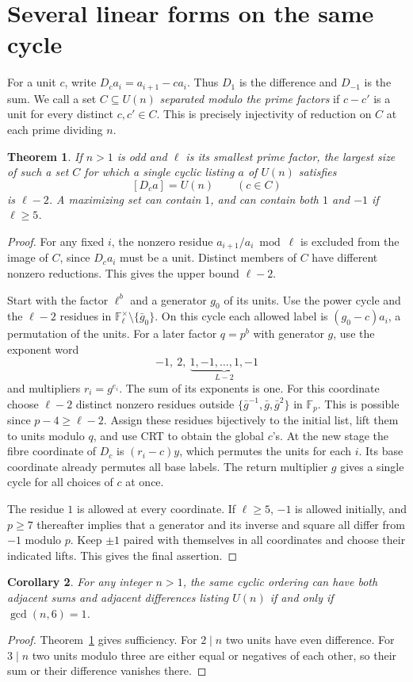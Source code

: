 \documentclass[11pt,a4paper]{article}
\newtheorem{theorem}{Theorem}[section]
\newtheorem{corollary}[theorem]{Corollary}
\newcommand{\U}{U}
\newcommand{\F}{\mathbb F}
\begin{document}
\section{Several linear forms on the same cycle}
For a unit $c$, write $D_c a_i=a_{i+1}-ca_i$. Thus $D_1$ is the difference and $D_{-1}$ is the sum. We call a set $C\subseteq\U(n)$ \emph{separated modulo the prime factors} if $c-c'$ is a unit for every distinct $c,c'\in C$. This is precisely injectivity of reduction on $C$ at each prime dividing $n$.
\begin{theorem}\label{thm:slopes}
If $n>1$ is odd and $\ell$ is its smallest prime factor, the largest size of such a set $C$ for which a single cyclic listing $a$ of $\U(n)$ satisfies
\[
                          [D_c a]=\U(n)\qquad(c\in C)
\]
is $\ell-2$. A maximizing set can contain $1$, and can contain both $1$ and $-1$ if $\ell\ge5$.
\end{theorem}
\begin{proof}
For any fixed $i$, the nonzero residue $a_{i+1}/a_i\bmod\ell$ is excluded from the image of $C$, since $D_ca_i$ must be a unit. Distinct members of $C$ have different nonzero reductions. This gives the upper bound $\ell-2$.
\par
Start with the factor $\ell^b$ and a generator $g_0$ of its units. Use the power cycle and the $\ell-2$ residues in $\F_\ell^\times\setminus\{\bar g_0\}$. On this cycle each allowed label is $(g_0-c)a_i$, a permutation of the units. For a later factor $q=p^b$ with generator $g$, use the exponent word
\[
                   -1,\ 2,\ \underbrace{1,-1,\ldots,1,-1}_{L-2}
\]
and multipliers $r_i=g^{e_i}$. The sum of its exponents is one. For this coordinate choose $\ell-2$ distinct nonzero residues outside $\{\bar g^{-1},\bar g,\bar g^2\}$ in $\F_p$. This is possible since $p-4\ge\ell-2$. Assign these residues bijectively to the initial list, lift them to units modulo $q$, and use CRT to obtain the global $c$'s. At the new stage the fibre coordinate of $D_c$ is $(r_i-c)y$, which permutes the units for each $i$. Its base coordinate already permutes all base labels. The return multiplier $g$ gives a single cycle for all choices of $c$ at once.
\par
The residue $1$ is allowed at every coordinate. If $\ell\ge5$, $-1$ is allowed initially, and $p\ge7$ thereafter implies that a generator and its inverse and square all differ from $-1$ modulo $p$. Keep $\pm1$ paired with themselves in all coordinates and choose their indicated lifts. This gives the final assertion.
\end{proof}
\begin{corollary}
For any integer $n>1$, the same cyclic ordering can have both adjacent sums and adjacent differences listing $\U(n)$ if and only if $\gcd(n,6)=1$.
\end{corollary}
\begin{proof}
Theorem~\ref{thm:slopes} gives sufficiency. For $2\mid n$ two units have even difference. For $3\mid n$ two units modulo three are either equal or negatives of each other, so their sum or their difference vanishes there.
\end{proof}
\end{document}
